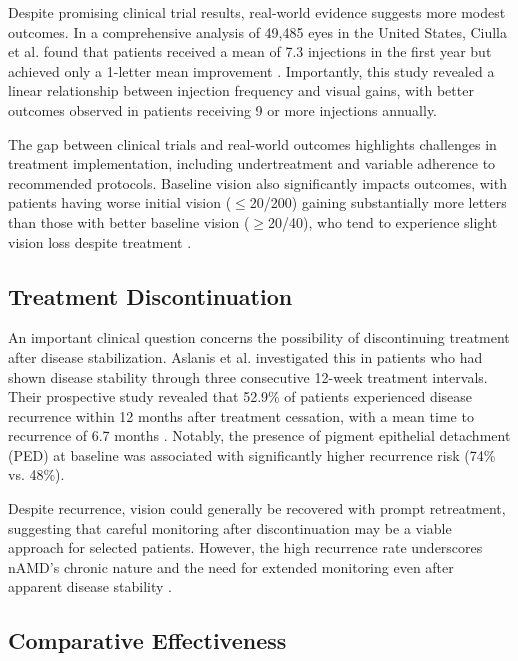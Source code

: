 Despite promising clinical trial results, real-world evidence suggests more modest outcomes. In a comprehensive analysis of 49,485 eyes in the United States, Ciulla et al. found that patients received a mean of 7.3 injections in the first year but achieved only a 1-letter mean improvement \citep{ciullaVisualAcuityOutcomes2020}. Importantly, this study revealed a linear relationship between injection frequency and visual gains, with better outcomes observed in patients receiving 9 or more injections annually.

The gap between clinical trials and real-world outcomes highlights challenges in treatment implementation, including undertreatment and variable adherence to recommended protocols. Baseline vision also significantly impacts outcomes, with patients having worse initial vision ($\leq$20/200) gaining substantially more letters than those with better baseline vision ($\geq$20/40), who tend to experience slight vision loss despite treatment \citep{ciullaVisualAcuityOutcomes2020}.

\subsection{Treatment Discontinuation}

An important clinical question concerns the possibility of discontinuing treatment after disease stabilization. Aslanis et al. investigated this in patients who had shown disease stability through three consecutive 12-week treatment intervals. Their prospective study revealed that 52.9\% of patients experienced disease recurrence within 12 months after treatment cessation, with a mean time to recurrence of 6.7 months \citep{aslanisRecurrentNeovascularAgeRelated2022}. Notably, the presence of pigment epithelial detachment (PED) at baseline was associated with significantly higher recurrence risk (74\% vs. 48\%).

Despite recurrence, vision could generally be recovered with prompt retreatment, suggesting that careful monitoring after discontinuation may be a viable approach for selected patients. However, the high recurrence rate underscores nAMD's chronic nature and the need for extended monitoring even after apparent disease stability \citep{aslanisRecurrentNeovascularAgeRelated2022}.

\subsection{Comparative Effectiveness}

